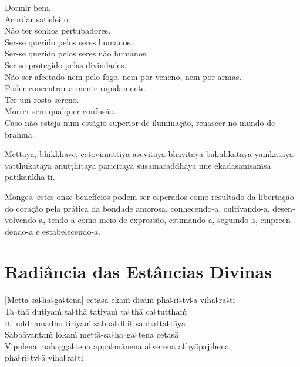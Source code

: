 \clearpage

\begin{english}
  Dormir bem.\\
  Acordar satisfeito.\\
  Não ter sonhos pertubadores.\\
  Ser-se querido pelos seres humanos.\\
  Ser-se querido pelos seres não humanos.\\
  Ser-se protegido pelas divindades.\\
  Não ser afectado nem pelo fogo, nem por veneno, nem por armas.\\
  Poder concentrar a mente rapidamente.\\
  Ter um rosto sereno.\\
  Morrer sem qualquer confusão.\\
  Caso não esteja num estágio superior de iluminação, renascer no mundo de brahma.
\end{english}

Mettāya, bhikkhave, cetovimuttiyā āsevitāya bhāvitāya bahulīkatāya yānīkatāya vatthukatāya anuṭṭhitāya paricitāya susamāraddhāya ime ekādasānisaṁsā pāṭikaṅkhā'ti.

\begin{english}
  Monges, estes onze benefícios podem ser esperados como resultado da libertação do coração pela prática da bondade amorosa, conhecendo-a, cultivando-a, desenvolvendo-a, tendo-a como meio de expressão, estimando-a, seguindo-a, empreendendo-a e estabelecendo-a.
\end{english}

\chapter*[Radiância das Estâncias Divinas]{Radiância das Estâncias Divinas}

\delegateSetUseNext


\begin{leader}
\end{leader}

[Mettā-sa꜕ha꜕ga꜕tena] cetasā ekaṁ disaṁ pha꜕ri꜕tv꜕ā viha꜕ra꜕ti\\
Ta꜕thā dutiyaṁ ta꜕thā tatiyaṁ ta꜕thā ca꜕tutthaṁ\\
Iti uddhamadho tiriyaṁ sabba꜕dhi꜕ sabbatta꜕tāya\\
Sabbāvantaṁ lokaṁ mettā-sa꜕ha꜕ga꜕tena cetasā\\
Vipulena mahagga꜕tena appa꜕māṇena a꜕verena a꜕byāpajjhena\\
\vin pha꜕ri꜕tv꜕ā viha꜕ra꜕ti

